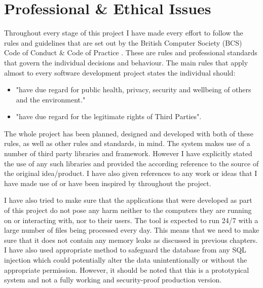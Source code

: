 \chapter{Professional \& Ethical Issues}
Throughout every stage of this project I have made every effort to follow the rules and guidelines that are set out by the British Computer Society (BCS) Code of Conduct \& Code of Practice \cite{bcsCodeOfConduct}. These are rules and professional standards that govern the individual decisions and behaviour. The main rules that apply almost to every software development project states the individual should:
\begin{itemize}
	\item "have due regard for public health, privacy, security and wellbeing of others and
the environment."\cite{bcsCodeOfConduct}
	\item "have due regard for the legitimate rights of Third Parties"\cite{bcsCodeOfConduct}.
\end{itemize}

The whole project has been planned, designed and developed with both of these rules, as well as other rules and standards, in mind. The system makes use of a number of third party libraries and framework. However I have explicitly stated the use of any such libraries and provided the according reference to the source of the original idea/product. I have also given references to any work or ideas that I have made use of or have been inspired by throughout the project.

I have also tried to make sure that the applications that were developed as part of this project do not pose any harm neither to the computers they are running on or interacting with, nor to their users. The tool is expected to run 24/7 with a large number of files being processed every day. This means that we need to make sure that it does not contain any memory leaks as discussed in previous chapters. I have also used appropriate method to safeguard the database from any SQL injection \cite{Su2006} which could potentially alter the data unintentionally or without the appropriate permission. However, it should be noted that this is a prototypical system and not a fully working and security-proof production version.

